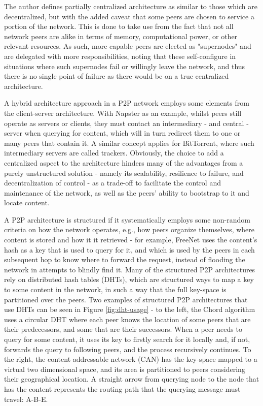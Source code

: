     The author defines partially centralized architecture as similar to those which are decentralized, but with the added caveat that some peers are chosen to service a portion of the network.
    This is done to take use from the fact that not all network peers are alike in terms of memory, computational power, or other relevant resources.
    As such, more capable peers are elected as "supernodes" and are delegated with more responsibilities, noting that these self-configure in situations where such supernodes fail or willingly leave the network, and thus there is no single point of failure as there would be on a true centralized architecture.

    A hybrid architecture approach in a P2P network  employs some elements from the client-server architecture.
    With Napster as an example, whilst peers still operate as servers or clients, they must contact an intermediary - and central - server when querying for content, which will in turn redirect them to one or many peers that contain it.
    A similar concept applies for BitTorrent, where such intermediary servers are called trackers.
    Obviously, the choice to add a centralized aspect to the architecture hinders many of the advantages from a purely unstructured solution - namely its scalability, resilience to failure, and decentralization of control - as a trade-off to facilitate the control and maintenance of the network, as well as the peers' ability to bootstrap to it and locate content.

    A P2P architecture is structured if it systematically employs some non-random criteria on how the network operates, e.g., how peers organize themselves, where content is stored and how it it retrieved - for example, FreeNet uses the content's hash as a key that is used to query for it, and which is used by the peers in each subsequent hop to know where to forward the request, instead of flooding the network in attempts to blindly find it.
    Many of the structured P2P architectures rely on distributed hash tables (DHTs), which are structured ways to map a key to some content in the network, in such a way that the full key-space is partitioned over the peers.
    Two examples of structured P2P architectures that use DHTs can be seen in Figure \ref{fig:dht-usage} - to the left, the Chord algorithm uses a circular DHT where each peer knows the location of some peers that are their predecessors, and some that are their successors.
    When a peer needs to query for some content, it uses its key to firstly search for it locally and, if not, forwards the query to following peers, and the process recursively continues.
    To the right, the content addressable network (CAN) has the key-space mapped to a virtual two dimensional space, and its area is partitioned to peers considering their geographical location.
    A straight arrow from querying node to the node that has the content represents the routing path that the querying message must travel: A-B-E.

